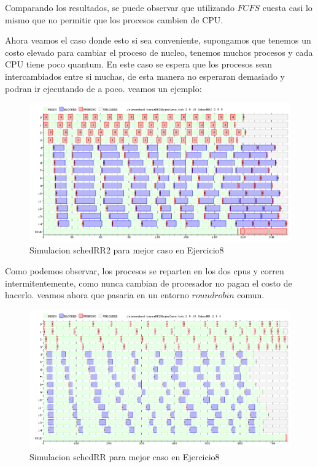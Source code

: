 \documentclass[11pt]{article}
\begin{document}
Comparando los resultados, se puede observar que utilizando $FCFS$ cuesta casi lo mismo que no permitir que los procesos cambien de CPU.


Ahora veamos el caso donde esto si sea conveniente, supongamos que tenemos un costo elevado para cambiar el proceso de nucleo, tenemos muchos procesos y cada CPU tiene poco quantum. En este caso se espera que los procesos sean intercambiados entre si muchas, de esta manera no esperaran demasiado y podran ir ejecutando de a poco. veamos un ejemplo:


  \begin{figure}[H]
    \includegraphics[scale=0.5]{Ej8MejorCasoRR2}
    \caption{Simulacion schedRR2 para mejor caso en Ejercicio8}
  \end{figure}

Como podemos observar, los procesos se reparten en los dos cpus y corren intermitentemente, como nunca cambian de procesador no pagan el costo de hacerlo. veamos ahora que pasaria en un entorno $round robin$ comun.

  \begin{figure}[H]
    \includegraphics[scale=0.5]{Ej8MejorCasoRR}
    \caption{Simulacion schedRR para mejor caso en Ejercicio8}
  \end{figure}
\end{document}
